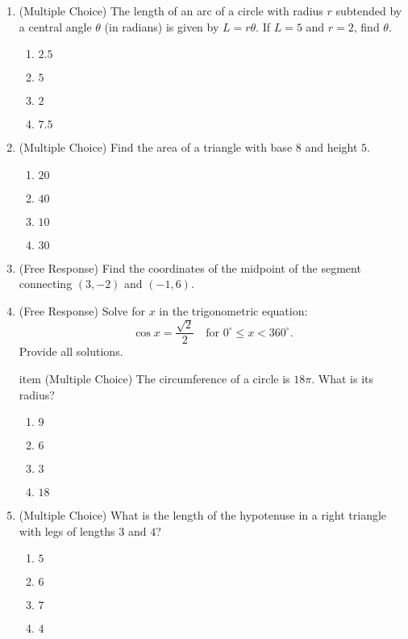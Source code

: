 \documentclass[12pt]{article}
\begin{document}
\begin{enumerate}[label=\textbf{Question \arabic*:}]
  \item (Multiple Choice) The length of an arc of a circle with radius \(r\) subtended by a central angle \(\theta\) (in radians) is given by \(L = r\theta\). If \(L = 5\) and \(r = 2\), find \(\theta\).
    \begin{enumerate}[label=(\Alph*)]
      \item \(2.5\)
      \item \(5\)
      \item \(2\)
      \item \(7.5\)
    \end{enumerate}
    
  \item (Multiple Choice) Find the area of a triangle with base \(8\) and height \(5\).
    \begin{enumerate}[label=(\Alph*)]
      \item \(20\)
      \item \(40\)
      \item \(10\)
      \item \(30\)
    \end{enumerate}
    
  \item (Free Response) Find the coordinates of the midpoint of the segment connecting \((3, -2)\) and \((-1, 6)\).
    
  \item (Free Response) Solve for \(x\) in the trigonometric equation:
    \[
    \cos x = \frac{\sqrt{2}}{2} \quad \text{for } 0^\circ \le x < 360^\circ.
    \]
    Provide all solutions.

    item (Multiple Choice) The circumference of a circle is \(18\pi\). What is its radius?
    \begin{enumerate}[label=(\Alph*)]
      \item \(9\)
      \item \(6\)
      \item \(3\)
      \item \(18\)
    \end{enumerate}
    
  \item (Multiple Choice) What is the length of the hypotenuse in a right triangle with legs of lengths \(3\) and \(4\)?
    \begin{enumerate}[label=(\Alph*)]
      \item \(5\)
      \item \(6\)
      \item \(7\)
      \item \(4\)
    \end{enumerate}
    

\end{enumerate}
\end{document}
